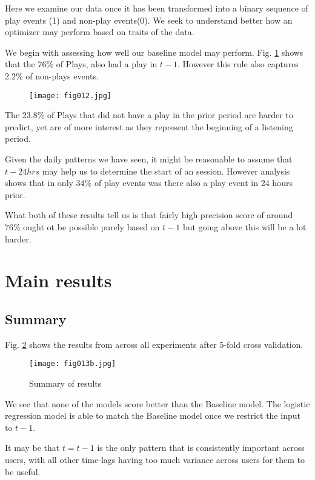 Here we examine our data once it has been transformed into a binary sequence of play events (1) and non-play events(0). We seek to understand better how an optimizer may perform based on traits of the data.

We begin with assessing how well our baseline model may perform. Fig. \ref{fig12} shows that the 76\% of Plays, also had a play in $t-1$. However this rule also captures 2.2\% of non-plays events.

\begin{figure}[h!]
	\centering
	\texttt{[image: fig012.jpg]}
	\caption{}
	\label{fig12}
\end{figure} 

The 23.8\% of Plays that did not have a play in the prior period are harder to predict, yet are of more interest as they represent the beginning of a listening period. 

Given the daily patterns we have seen, it might be reasonable to assume that $t-24hrs$ may help us to determine the start of an session. However analysis shows that in only 34\% of play events was there also a play event in 24 hours prior.

What both of these results tell us is that fairly high precision score of around 76\% ought ot be possible purely based on $t-1$ but going above this will be a lot harder.

\section{Main results} %

\subsection{Summary}

Fig. \ref{fig13b} shows the results from across all experiments after 5-fold cross validation.

\begin{figure}[h!]
	\centering
	\texttt{[image: fig013b.jpg]}
	\caption{Summary of results}
	\label{fig13b}
\end{figure}  

We see that none of the models score better than the Baseline model. The logistic regression model is able to match the Baseline model once we restrict the input to $t-1$. 

It may be that $t = t-1$ is the only pattern that is consistently important across users, with all other time-lags having too much variance across users for them to be useful.

